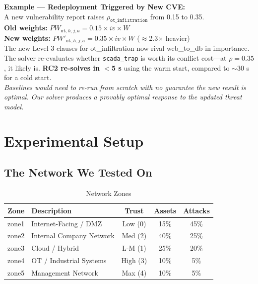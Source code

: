 \documentclass[journal]{IEEEtran}
\begin{document}
\begin{examplebox}
\textbf{Example --- Redeployment Triggered by New CVE:}\\[3pt]
A new vulnerability report raises
$\rho_{\texttt{ot\_infiltration}}$ from 0.15 to 0.35.\\
\textbf{Old weights:} $PW_{\texttt{ot},h,j,a}
= 0.15 \times iv \times W$\\
\textbf{New weights:} $PW'_{\texttt{ot},h,j,a}
= 0.35 \times iv \times W$ ($\approx$2.3$\times$ heavier)\\[3pt]
The new Level-3 clauses for ot\_infiltration now rival
web\_to\_db in importance.
The solver re-evaluates whether \texttt{scada\_trap} is
worth its conflict cost---at $\rho=0.35$, it likely is.
\textbf{RC2 re-solves in $<$5 s} using the warm start,
compared to $\sim$30 s for a cold start.\\[3pt]
\textit{Baselines would need to re-run from scratch with no
guarantee the new result is optimal.
Our solver produces a \emph{provably optimal} response to
the updated threat model.}
\end{examplebox}

\section{Experimental Setup}
\label{sec:methodology}

\subsection{The Network We Tested On}

\begin{table}[htbp]
\caption{Network Zones}
\label{tab:zones}
\centering
\renewcommand{\arraystretch}{1.2}
\begin{tabular}{@{}llccc@{}}
\toprule
\textbf{Zone} & \textbf{Description} &
\textbf{Trust} & \textbf{Assets} & \textbf{Attacks} \\
\midrule
zone1 & Internet-Facing / DMZ    & Low (0)  & 15\% & 45\% \\
zone2 & Internal Company Network & Med (2)  & 40\% & 25\% \\
zone3 & Cloud / Hybrid           & L-M (1)  & 25\% & 20\% \\
zone4 & OT / Industrial Systems  & High (3) & 10\% &  5\% \\
zone5 & Management Network       & Max (4)  & 10\% &  5\% \\
\bottomrule
\end{tabular}
\end{table}
\end{document}
